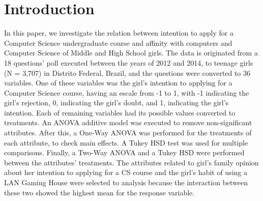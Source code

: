 \section{Introduction}\label{sec:intro}%
%

%
In this paper, we investigate the relation between intention to apply for a Computer Science undergraduate course and affinity with computers and Computer Science of Middle and High School girls. The data is originated from a 18 questions' poll executed between the years of 2012 and 2014, to teenage girls (N = 3,707) in Distrito Federal, Brazil, and the questions were converted to 36 variables. One of these variables was the girl's intention to applying for a Computer Science course, having an escale from -1 to 1, with -1 indicating the girl's rejection, 0, indicating the girl's doubt, and 1, indicating the girl's intention. Each of remaining variables had its possible values converted to treatments. An ANOVA additive model was executed to remove non-significant attributes. After this, a One-Way ANOVA was performed for the treatments of each attribute, to check main effects. A Tukey HSD test was used for multiple comparisons. Finally, a Two-Way ANOVA and a Tukey HSD were performed between the attributes' treatments. The attributes related to girl's family opinion about her intention to applying for a CS course and the girl's habit of using a LAN Gaming House were selected to analysis because the interaction between these two showed the highest mean for the response variable.

%
